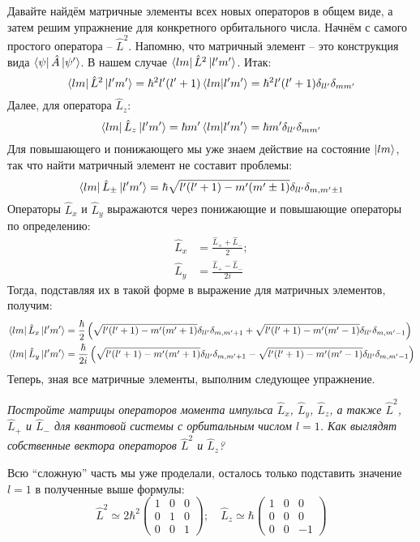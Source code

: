 Давайте найдём матричные элементы всех новых операторов в общем виде, а затем решим упражнение для конкретного орбитального числа. Начнём с самого простого оператора -- $\hat{L}^2$. Напомню, что матричный элемент -- это конструкция вида $\bra{\psi}\hat{A}\ket{\psi'}$. В нашем случае $\bra{lm}\hat{L}^2\ket{l'm'}$. Итак:
\[
\bra{lm}\hat{L}^2\ket{l'm'} = \hbar^2l'(l'+1)\bra{lm}\ket{l'm'} = \hbar^2l'(l'+1)\delta_{ll'}\delta_{mm'}
\]
Далее, для оператора $\hat{L}_z$:
\[
\bra{lm}\hat{L}_z\ket{l'm'} = \hbar m'\bra{lm}\ket{l'm'} = \hbar m'\delta_{ll'}\delta_{mm'}
\]
Для повышающего и понижающего мы уже знаем действие на состояние $\ket{lm}$, так что найти матричный элемент не составит проблемы:
\[
    \bra{lm}\hat{L}_{\pm}\ket{l'm'} = \hbar\sqrt{l'(l'+1) - m'(m' \pm 1)}\delta_{ll'}\delta_{m,m'\pm 1}
\]
Операторы $\hat{L}_x$ и $\hat{L}_y$ выражаются через понижающие и повышающие операторы по определению:
\begin{align*}
    \hat{L}_x & = \frac{\hat{L}_+ + \hat{L}_-}{2};\\
    \hat{L}_y & = \frac{\hat{L}_+ - \hat{L}_-}{2i}
\end{align*}
Тогда, подставляя их в такой форме в выражение для матричных элементов, получим:
\begin{align*}
\bra{lm}\hat{L}_{x}\ket{l'm'} &= \frac{\hbar}{2}\left(\sqrt{l'(l'+1) - m'(m' + 1)}\delta_{ll'}\delta_{m,m' + 1} + \sqrt{l'(l'+1) - m'(m' - 1)}\delta_{ll'}\delta_{m,m' - 1}\right)\\
\bra{lm}\hat{L}_{y}\ket{l'm'} &= \frac{\hbar}{2i}\left(\sqrt{l'(l'+1) - m'(m' + 1)}\delta_{ll'}\delta_{m,m' + 1} - \sqrt{l'(l'+1) - m'(m' - 1)}\delta_{ll'}\delta_{m,m' - 1}\right)
\end{align*}
Теперь, зная все матричные элементы, выполним следующее упражнение.
\begin{center}
    \textit{Постройте матрицы операторов момента импульса $\hat{L}_x$, $\hat{L}_y$, $\hat{L}_z$, а также $\hat{L}^2$, $\hat{L}_+$ и $\hat{L}_-$ для квантовой системы с орбитальным числом $l = 1$. Как выглядят собственные вектора операторов $\hat{L}^2$ и $\hat{L}_z$?}
\end{center}

Всю ``сложную'' часть мы уже проделали, осталось только подставить значение $l = 1$ в полученные выше формулы:
\[
\hat{L}^2 \simeq 2\hbar^2 \begin{pmatrix}
    1 & 0 & 0 \\ 0 & 1 & 0 \\ 0 & 0 & 1 
\end{pmatrix}; \quad 
\hat{L}_z \simeq \hbar \begin{pmatrix}
    1 & 0 & 0 \\ 0 & 0 & 0 \\ 0 & 0 & -1
\end{pmatrix}
\]

